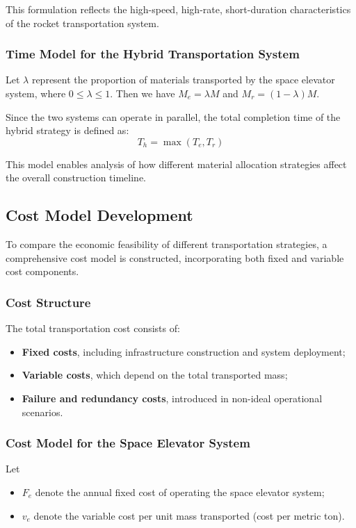\documentclass[12pt]{mcmthesis}
\begin{document}
This formulation reflects the high-speed, high-rate, short-duration characteristics of the rocket transportation system.

\subsubsection{Time Model for the Hybrid Transportation System}

Let $\lambda$ represent the proportion of materials transported by the space elevator system, where $0 \leq \lambda \leq 1$. Then we have $M_e = \lambda M$ and $M_r = (1-\lambda)M$.

Since the two systems can operate in parallel, the total completion time of the hybrid strategy is defined as:
\[
    T_{h} = \max(T_e, T_r)
\]

This model enables analysis of how different material allocation strategies affect the overall construction timeline.

\subsection{Cost Model Development}

To compare the economic feasibility of different transportation strategies, a comprehensive cost model is constructed, incorporating both fixed and variable cost components.

\subsubsection{Cost Structure}

The total transportation cost consists of:
\begin{itemize}
    \item \textbf{Fixed costs}, including infrastructure construction and system deployment;
    \item \textbf{Variable costs}, which depend on the total transported mass;
    \item \textbf{Failure and redundancy costs}, introduced in non-ideal operational scenarios.
\end{itemize}

\subsubsection{Cost Model for the Space Elevator System}

Let
\begin{itemize}
    \item $F_e$ denote the annual fixed cost of operating the space elevator system;
    \item $v_e$ denote the variable cost per unit mass transported (cost per metric ton).
\end{itemize}
\end{document}

